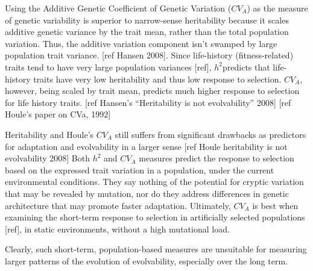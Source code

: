 Using the Additive Genetic Coefficient of Genetic Variation ($CV_A$) as the measure of genetic variability is superior to narrow-sense heritability because it scales additive genetic variance by the trait mean, rather than the total population variation. Thus, the additive variation component isn’t swamped by large population trait variance. [ref Hansen 2008]. Since life-history (fitness-related) traits tend to have very large population variances [ref], $h^2$predicts that life-history traits have very low heritability and thus low response to selection. $CV_A$, however, being scaled by trait mean, predicts much higher response to selection for life history traits. [ref  Hansen’s “Heritability is not evolvability” 2008] [ref Houle’s paper on CVa, 1992]

Heritability and Houle’s $CV_A$ still suffers from significant drawbacks as predictors for adaptation and evolvability in a larger sense [ref Houle heritability is not evolvability 2008] Both $h^2$ and $CV_A$ measures predict the response to selection based on the expressed trait variation in a population, under the current environmental conditions. They say nothing of the potential for cryptic variation that may be revealed by mutation, nor do they address differences in genetic architecture that may promote faster adaptation. Ultimately, $CV_A$ is best when examining the short-term response to selection in artificially selected populations [ref], in static environments, without a high mutational load.

Clearly, such short-term, population-based measures are unsuitable for measuring larger patterns of the evolution of evolvability, especially over the long term.


